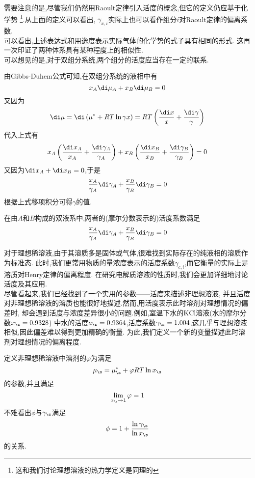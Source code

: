 \documentclass{ctexart}
\begin{document}
需要注意的是,尽管我们仍然用Raoult定律引入活度的概念,但它的定义仍应基于化学势%
\footnote{这和我们讨论理想溶液的热力学定义是同理的}.从上面的定义可以看出,%
$\gamma_{x,i}$实际上也可以看作组分$i$对Raoult定律的偏离系数.\\
\indent 可以看出,上述表达式和用逸度表示实际气体的化学势的式子具有相同的形式.%
这再一次印证了两种体系具有某种程度上的相似性.\\
\indent 可以想见的是,对于双组分系统,两个组分的活度应当存在一定的联系.
\begin{derivation}
    由Gibbs-Duhem公式可知,在双组分系统的液相中有
    \[x_A\di\mu_A+x_B\di\mu_B=0\]
    又因为
    \[\di\mu=\di\left(\mu^\ast+RT\ln\gamma x\right)=RT\left(\dfrac{\di x}{x}+\dfrac{\di\gamma}{\gamma}\right)\]
    代入上式有
    \[x_A\left(\dfrac{\di x_A}{x_A}+\dfrac{\di\gamma_A}{\gamma_A}\right)+
    x_B\left(\dfrac{\di x_B}{x_B}+\dfrac{\di\gamma_B}{\gamma_B}\right)=0\]
    又因为$\di x_A+\di x_B=0$,于是
    \[\dfrac{x_A}{\gamma_A}\di\gamma_A+\dfrac{x_B}{\gamma_B}\di\gamma_B=0\]
    根据上式移项积分可得$\gamma$的值.
\end{derivation}
\begin{theorem}[4C.5.2 双组分系统中活度的关系]
    在由$A$和$B$构成的双液系中,两者的(摩尔分数表示的)活度系数满足
    \[\dfrac{x_A}{\gamma_A}\di\gamma_A+\dfrac{x_B}{\gamma_B}\di\gamma_B=0\]

\end{theorem}
\indent 对于理想稀溶液,由于其溶质多是固体或气体,很难找到实际存在的纯液相的溶质作为标准态.%
此时,我们更常用物质的量浓度表示的活度系数$\gamma_{c,i}$,而它衡量的实际上是溶质对Henry定律的偏离程度.%
在研究电解质溶液的性质时,我们会更加详细地讨论活度及其应用.\vspace{4pt}\\
\indent 尽管看起来,我们已经找到了一个实用的参数——活度来描述非理想溶液,%
并且活度对非理想稀溶液的溶质也能很好地描述.然而,用活度表示此时溶剂对理想情况的偏差时,%
却会遇到活度与浓度差异很小的问题.例如,室温下水的$\text{KCl}$溶液(水的摩尔分数$x_\s=0.9328$)%
中水的活度$a_\s=0.9364$,活度系数$\gamma_\s=1.004$,这几乎与理想溶液相似,因此偏差难以得到更加精确的衡量.%
为此,我们定义一个新的变量描述此时溶剂对理想情况的偏离程度.
\begin{definition}[4C.5.3 渗透因子]
    定义非理想稀溶液中溶剂的$\varphi$为满足
    \[\mu_\s=\mu_{\s}^\ast+\varphi RT\ln x_\s\]
    的参数,并且满足
    \[\lim_{x_\s\to1}\varphi=1\]
    不难看出$\phi$与$\gamma_\s$满足
    \[\phi=1+\dfrac{\ln\gamma_\s}{\ln x_\s}\]
    的关系.
\end{definition}
\end{document}
